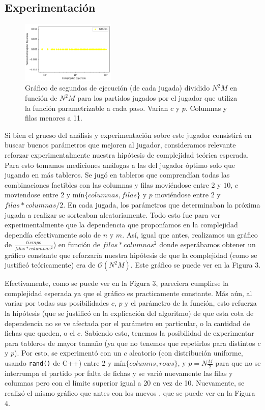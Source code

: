 \documentclass[A4paper,oneside,fleqn,11pt]{article}
\theoremstyle{definition}
\begin{document}
\subsection{Experimentación}


\begin{figure}
	\includegraphics[width=0.4\textwidth]{complejidad2.png}
	\caption{ Gráfico de segundos de ejecución (de cada jugada) dividido $N^2 M$ en función de $N^2  M$ para los partidos jugados por el jugador que utiliza la función parametrizable a cada paso. Varian $c$ y $p$. Columnas y filas menores a 11.}
\end{figure}

Si bien el grueso del análisis y experimentación sobre este jugador consistirá en buscar buenos parámetros que mejoren al jugador, consideramos relevante reforzar experimentalmente nuestra hipótesis de complejidad teórica esperada. Para esto tomamos mediciones análogas a las del jugador óptimo solo que jugando en más tableros. Se jugó en tableros que comprendían todas las combinaciones factibles con las columnas y filas moviéndose entre $2$ y $10$, $c$ moviendose entre $2$ y mín$\{columnas,filas\}$ y $p$ moviéndose entre $2$ y $filas*columnas/2$. En cada jugada, los parámetros que determinaban la próxima jugada a realizar se sorteaban aleatoriamente. Todo esto fue para ver experimentalmente que la dependencia que proponíamos en la complejidad dependía efectivamente solo de $n$ y $m$. Así, igual que antes, realizamos un gráfico de $\frac{tiempo}{filas*columnas^2}$) en función de $filas*columnas^2$ donde esperábamos obtener un gráfico constante que reforzaría nuestra hipótesis de que la complejidad (como se justificó teóricamente) era de $\mathcal{O}(N^2 M)$. Este gráfico se puede ver en la Figura 3.




Efectivamente, como se puede ver en la Figura 3, pareciera cumplirse la complejidad esperada ya que el gráfico es practicamente constante. Más aún, al variar por todas sus posibilidades $c$, $p$ y el parámetro de la función, esto refuerza la hipótesis (que se justificó en la explicación del algoritmo) de que esta cota de dependencia no se ve afectada por el parámetro en particular, o la cantidad de fichas que queden, o el $c$. Sabiendo esto, tenemos la posibilidad de experimentar para tableros de mayor tamaño (ya que no tenemos que repetirlos para distintos $c$ y $p$). Por esto, se experimentó con un $c$ aleatorio (con distribución uniforme, usando \texttt{rand()} de C++) entre 2 y mín$\{columns,rows\}$, y $p=N\frac{M}{2}$ para que no se interrumpa el partido por falta de fichas y se varió nuevamente las filas y columnas pero con el límite superior igual a 20 en vez de 10. Nuevamente, se realizó el mismo gráfico que antes con los nuevos , que se puede ver en la Figura 4.
\end{document}
